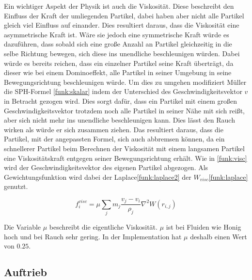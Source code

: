 \documentclass[intern,palatino]{cgBA}
\begin{document}
Ein wichtiger Aspekt der Physik ist auch die Viskosität. Diese beschreibt den Einfluss der Kraft der umliegenden Partikel, dabei haben aber nicht alle Partikel gleich viel Einfluss auf einander. Dies resultiert daraus, dass die Viskosität eine asymmetrische Kraft ist. Wäre sie jedoch eine symmetrische Kraft würde es dazuführen, dass sobald sich eine große Anzahl an Partikel gleichzeitig in die selbe Richtung bewegen, sich diese ins unendliche beschleunigen würden. Dabei würde es bereits reichen, dass ein einzelner Partikel seine Kraft überträgt, da dieser wie bei einem Dominoeffekt, alle Partikel in seiner Umgebung in seine Bewegungsrichtung beschleunigen würde. Um dies zu umgehen modifiziert Müller \cite{muller2003particle} die SPH-Formel \ref{funk:skalar} indem der Unterschied des Geschwindigkeitsvektor $v$ in Betracht gezogen wird. Dies sorgt dafür, dass ein Partikel mit einem großen Geschwindigkeitsvektor trotzdem noch alle Partikel in seiner Nähe mit sich reißt, aber sich nicht mehr ins unendliche beschleunigen kann.
\newline
Dies lässt den Rauch wirken als würde er sich zusammen ziehen. Das resultiert daraus, dass die Partikel, mit der angepassten Formel, sich auch abbremsen können, da ein schnellerer Partikel beim Berechnen der Viskosität mit einem langsamen Partikel eine Viskositätskraft entgegen seiner Bewegungsrichtung erhält. 
\newline
Wie in \ref{funk:visc} wird der Geschwindigkeitsvektor des eigenen Partikel abgezogen. Als Gewichtungsfunktion wird dabei der Laplace\ref{funk:laplace2} der $W_{visc}$\ref{funk:laplace} genutzt.

\begin{equation}\label{funk:visc}
f^{visc}_i  = \mu \sum_j m_j \frac{v_j-v_i}{\rho_j} \nabla^2 W(r_{i,j})
\end{equation}

Die Variable $\mu$ beschreibt die eigentliche Viskosität. $\mu$ ist bei Fluiden wie Honig hoch und bei Rauch sehr gering. In der Implementation hat $\mu$ deshalb einen Wert von $0.25$.


\subsection{Auftrieb}\label{auftrieb}
\end{document}
